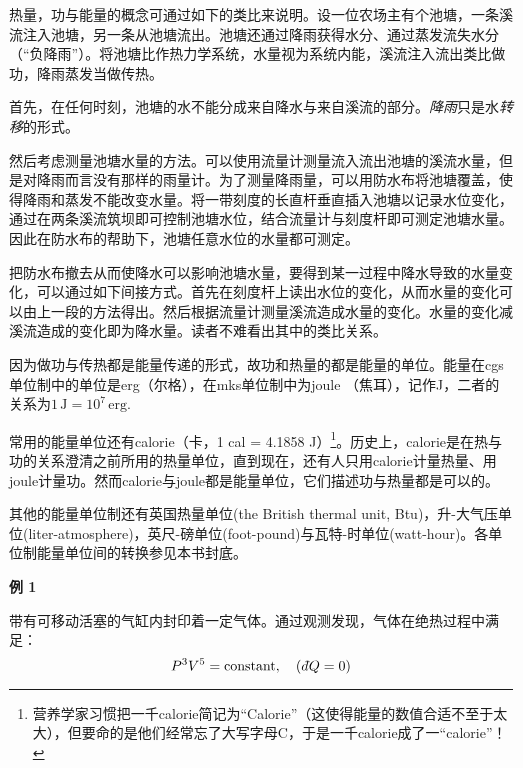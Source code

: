 热量，功与能量的概念可通过如下的类比来说明。设一位农场主有个池塘，一条溪流注入池塘，另一条从池塘流出。池塘还通过降雨获得水分、通过蒸发流失水分（“负降雨”）。将池塘比作热力学系统，水量视为系统内能，溪流注入流出类比做功，降雨蒸发当做传热。

首先，在任何时刻，池塘的水不能分成来自降水与来自溪流的部分。{\it 降雨}只是水{\it 转移}的形式。

然后考虑测量池塘水量的方法。可以使用流量计测量流入流出池塘的溪流水量，但是对降雨而言没有那样的雨量计。为了测量降雨量，可以用防水布将池塘覆盖，使得降雨和蒸发不能改变水量。将一带刻度的长直杆垂直插入池塘以记录水位变化，通过在两条溪流筑坝即可控制池塘水位，结合流量计与刻度杆即可测定池塘水量。因此在防水布的帮助下，池塘任意水位的水量都可测定。

把防水布撤去从而使降水可以影响池塘水量，要得到某一过程中降水导致的水量变化，可以通过如下间接方式。首先在刻度杆上读出水位的变化，从而水量的变化可以由上一段的方法得出。然后根据流量计测量溪流造成水量的变化。水量的变化减溪流造成的变化即为降水量。读者不难看出其中的类比关系。

因为做功与传热都是能量传递的形式，故功和热量的都是能量的单位。能量在cgs单位制中的单位是erg（尔格），在mks单位制中为joule （焦耳），记作J，二者的关系为$1\, \mathrm{J} = 10^7\, \mathrm{erg}.$

常用的能量单位还有calorie（卡，1 cal = 4.1858 J）\footnote{营养学家习惯把一千calorie简记为``Calorie''（这使得能量的数值合适不至于太大），但要命的是他们经常忘了大写字母C，于是一千calorie成了一``calorie''！}。历史上，calorie是在热与功的关系澄清之前所用的热量单位，直到现在，还有人只用calorie计量热量、用joule计量功。然而calorie与joule都是能量单位，它们描述功与热量都是可以的。

其他的能量单位制还有英国热量单位(the British thermal unit, Btu)，升-大气压单位(liter-atmosphere)，英尺-磅单位(foot-pound)与瓦特-时单位(watt-hour)。各单位制能量单位间的转换参见本书封底。

{\bf {\large 例 1}}
\ 

带有可移动活塞的气缸内封印着一定气体。通过观测发现，气体在绝热过程中满足：
\[
	P^3 V^5 = \text{constant}, \quad (d\hspace*{-0.08em}\bar{}\hspace*{0.1em} Q = 0)
\]

